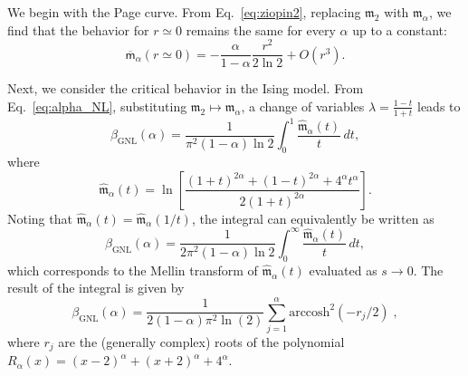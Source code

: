 \documentclass[prx,twocolumn,superscriptaddress,aps,10pt, frontmatterverbose, reprint,footinbib,longbibliography=true]{revtex4-2}
\begin{document}
We begin with the Page curve. From Eq.~\eqref{eq:ziopin2}, replacing $\mathfrak{m}_2$ with $\mathfrak{m}_\alpha$, we find that the behavior for $r \simeq 0$ remains the same for every $\alpha$ up to a constant:
\begin{equation}
\overline{\mathsf{m}}_\alpha(r \simeq 0) = - \frac{\alpha}{1-\alpha} \frac{r^2}{2 \ln 2} + O(r^3).
\end{equation}

Next, we consider the critical behavior in the Ising model. From Eq.~\eqref{eq:alpha_NL}, substituting $\mathfrak{m}_2 \mapsto \mathfrak{m}_\alpha$, a change of variables $\lambda = \frac{1-t}{1+t}$ leads to
\begin{equation}
\beta_{\mathrm{GNL}}(\alpha) = \frac{1}{\pi^2 (1-\alpha) \ln 2} \int_0^1 \frac{\hat{\mathfrak{m}}_\alpha(t)}{t}\, dt,
\end{equation}
where
\begin{equation}
\hat{\mathfrak{m}}_\alpha(t) = \ln \left[ \frac{(1+t)^{2\alpha} + (1-t)^{2\alpha} + 4^\alpha t^\alpha}{2 (1+t)^{2\alpha}} \right].
\end{equation}
Noting that $\hat{\mathfrak{m}}_\alpha(t) = \hat{\mathfrak{m}}_\alpha(1/t)$, the integral can equivalently be written as
\begin{equation}
\beta_{\mathrm{GNL}}(\alpha) = \frac{1}{2 \pi^2 (1-\alpha) \ln 2} \int_0^\infty \frac{\hat{\mathfrak{m}}_\alpha(t)}{t}\, dt,
\end{equation} 
which corresponds to the Mellin transform of $\hat{\mathfrak{m}}_\alpha(t)$ evaluated as $s \to 0$.
The result of the integral is given by 
\begin{equation}
\beta_{\mathrm{GNL}}(\alpha) = \frac{1}{2 (1-\alpha) \pi^2 \ln(2)}\sum_{j=1}^\alpha \mathrm{arccosh}^2(-r_j/2)\;,
\end{equation}
where $r_j$ are the (generally complex) roots of the polynomial $R_\alpha(x)=(x-2)^\alpha+(x+2)^\alpha+4^\alpha$.





\end{document}
